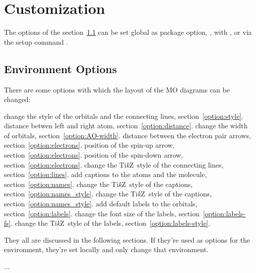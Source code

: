\documentclass[load-preamble+]{cnltx-doc}
\newcommand*\TikZ{Ti\textit{k}Z}
\begin{document}
\section{Customization}
The options of the section~\ref{ssec:umgebungs_optionen} can be set global as
package option, \ie, with , or
via the setup command .

\subsection{Environment Options}\label{ssec:umgebungs_optionen}
There are some options with which the layout of the \ac{MO} diagrams can be
changed:
\begin{options}
    change the style of the orbitals and the connecting lines,
    section~\ref{option:style}.
    distance betwen left and right atom,
    section~\ref{option:distance}.
    change the width of orbitals,
    section~\ref{option:AO-width}.
    distance between the electron pair arrows,
    section~\ref{option:electrons}.
    position of the spin-up arrow,
    section~\ref{option:electrons}.
    position of the spin-down arrow,
    section~\ref{option:electrons}.
    change the \TikZ\ style of the connecting lines,
    section~\ref{option:lines}.
    add captions to the atoms and the molecule,
    section~\ref{option:names}.
    change the \TikZ\ style of the captions,
    section~\ref{option:names_style}.
    change the \TikZ\ style of the captions,
    section~\ref{option:names_style}.
    add default labels to the orbitals,
    section~\ref{option:labels}.
    change the font size of the labels,
    section~\ref{option:labels-fs}.
    change the \TikZ\ style of the labels,
    section~\ref{option:labels-style}.
\end{options}
They all are discussed in the following sections.  If they're used as options
for the environment, they're set locally and only change that environment.
\begin{sourcecode}
  \begin{modiagram}[options]
    ...
  \end{modiagram}
\end{sourcecode}
\end{document}
